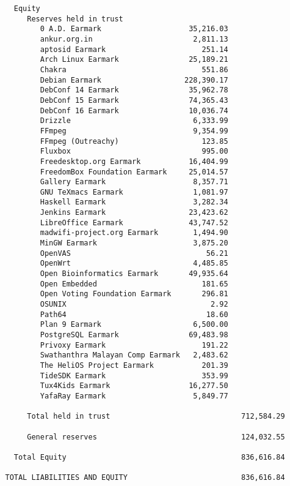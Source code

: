 \documentclass[letterpaper]{report}
\begin{document}
\begin{verbatim}
     Equity
        Reserves held in trust
           0 A.D. Earmark                    35,216.03
           ankur.org.in                       2,811.13
           aptosid Earmark                      251.14
           Arch Linux Earmark                25,189.21
           Chakra                               551.86
           Debian Earmark                   228,390.17
           DebConf 14 Earmark                35,962.78
           DebConf 15 Earmark                74,365.43
           DebConf 16 Earmark                10,036.74
           Drizzle                            6,333.99
           FFmpeg                             9,354.99
           FFmpeg (Outreachy)                   123.85
           Fluxbox                              995.00
           Freedesktop.org Earmark           16,404.99
           FreedomBox Foundation Earmark     25,014.57
           Gallery Earmark                    8,357.71
           GNU TeXmacs Earmark                1,081.97
           Haskell Earmark                    3,282.34
           Jenkins Earmark                   23,423.62
           LibreOffice Earmark               43,747.52
           madwifi-project.org Earmark        1,494.90
           MinGW Earmark                      3,875.20
           OpenVAS                               56.21
           OpenWrt                            4,485.85
           Open Bioinformatics Earmark       49,935.64
           Open Embedded                        181.65
           Open Voting Foundation Earmark       296.81
           OSUNIX                                 2.92
           Path64                                18.60
           Plan 9 Earmark                     6,500.00
           PostgreSQL Earmark                69,483.98
           Privoxy Earmark                      191.22
           Swathanthra Malayan Comp Earmark   2,483.62
           The HeliOS Project Earmark           201.39
           TideSDK Earmark                      353.99
           Tux4Kids Earmark                  16,277.50
           YafaRay Earmark                    5,849.77

        Total held in trust                              712,584.29

        General reserves                                 124,032.55

     Total Equity                                        836,616.84

   TOTAL LIABILITIES AND EQUITY                          836,616.84
\end{verbatim}
\end{document}
